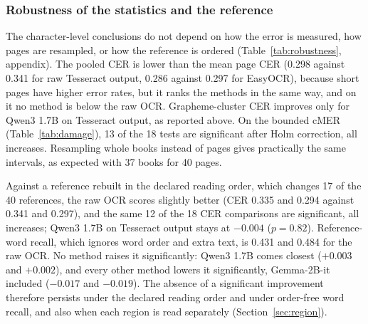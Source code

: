 \documentclass[conference]{IEEEtran}
\begin{document}
\subsubsection{Robustness of the statistics and the reference}
\label{sec:robustness}
The character-level conclusions do not depend on how the error is measured, how pages are resampled, or how the reference is ordered (Table~\ref{tab:robustness}, appendix). The pooled CER is lower than the mean page CER (0.298 against 0.341 for raw Tesseract output, 0.286 against 0.297 for EasyOCR), because short pages have higher error rates, but it ranks the methods in the same way, and on it no method is below the raw OCR. Grapheme-cluster CER improves only for Qwen3 1.7B on Tesseract output, as reported above. On the bounded cMER (Table~\ref{tab:damage}), 13 of the 18 tests are significant after Holm correction, all increases. Resampling whole books instead of pages gives practically the same intervals, as expected with 37 books for 40 pages.

Against a reference rebuilt in the declared reading order, which changes 17 of the 40 references, the raw OCR scores slightly better (CER 0.335 and 0.294 against 0.341 and 0.297), and the same 12 of the 18 CER comparisons are significant, all increases; Qwen3 1.7B on Tesseract output stays at $-0.004$ ($p=0.82$). Reference-word recall, which ignores word order and extra text, is 0.431 and 0.484 for the raw OCR. No method raises it significantly: Qwen3 1.7B comes closest ($+0.003$ and $+0.002$), and every other method lowers it significantly, Gemma-2B-it included ($-0.017$ and $-0.019$). The absence of a significant improvement therefore persists under the declared reading order and under order-free word recall, and also when each region is read separately (Section~\ref{sec:region}).
\end{document}
